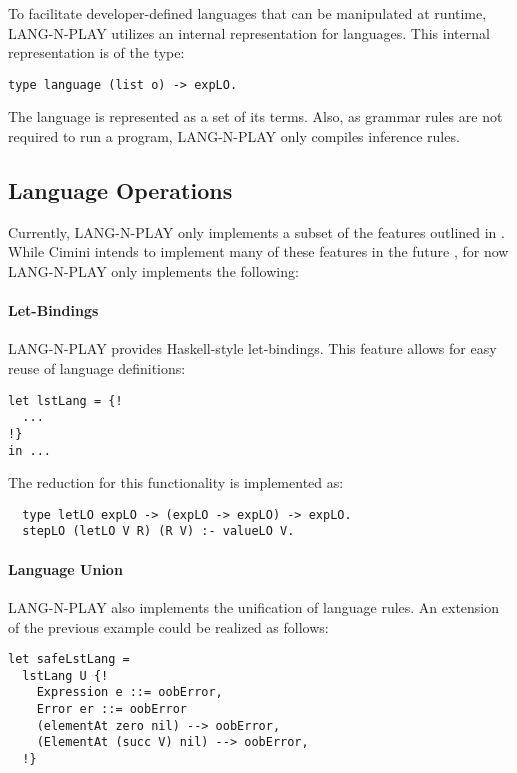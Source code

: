 To facilitate developer-defined languages that can be manipulated at runtime, LANG-N-PLAY utilizes an internal representation for languages. This internal representation is of the type:

\begin{lstlisting}
type language (list o) -> expLO.
\end{lstlisting}

The language is represented as a set of its terms. Also, as grammar rules are not required to run a program, LANG-N-PLAY only compiles inference rules.


\subsection{Language Operations}
Currently, LANG-N-PLAY only implements a subset of the features outlined in . While Cimini intends to implement many of these features in the future \cite{cimini_effectiveness_2020}, for now LANG-N-PLAY only implements the following:

\paragraph{Let-Bindings}
LANG-N-PLAY provides Haskell-style let-bindings. This feature allows for easy reuse of language definitions:

\begin{lstlisting}
let lstLang = {!
  ...
!}
in ...
\end{lstlisting}

The reduction for this functionality is implemented as:

\begin{lstlisting}
  type letLO expLO -> (expLO -> expLO) -> expLO.
  stepLO (letLO V R) (R V) :- valueLO V.
\end{lstlisting}

\paragraph{Language Union}
LANG-N-PLAY also implements the unification of language rules. An extension of the previous example could be realized as follows:

\begin{lstlisting}
let safeLstLang = 
  lstLang U {!
    Expression e ::= oobError,
    Error er ::= oobError
    (elementAt zero nil) --> oobError,
    (ElementAt (succ V) nil) --> oobError,
  !}
\end{lstlisting}

